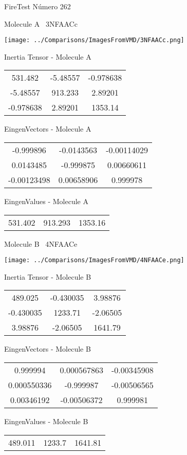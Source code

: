 \vtab[-3cm]
\begin{center}
{\large FireTest \tab Número 262}
\end{center}
\begin{multicols}{2}
\begin{center}

Molecule A \
3NFAACc

\texttt{[image: ../Comparisons/ImagesFromVMD/3NFAACc.png]}

Inertia Tensor - Molecule A \\
\begin{tabular}{|c c c|}
531.482	 & 	-5.48557	 & 	-0.978638	 \\
-5.48557	 & 	913.233	 & 	2.89201	 \\
-0.978638	 & 	2.89201	 & 	1353.14
\end{tabular}

\vtab
 EingenVectors - Molecule A     \\
\begin{tabular}{|c c c|}
-0.999896	 & 	-0.0143563	 & 	-0.00114029	 \\
0.0143485	 & 	-0.999875	 & 	0.00660611	 \\
-0.00123498	 & 	0.00658906	 & 	0.999978
\end{tabular}

\vtab
 EingenValues - Molecule A     \\
\begin{tabular}{|c c c|}
531.402	 & 	913.293	 & 	1353.16	 \\
\end{tabular}
\columnbreak

Molecule B \
4NFAACe

\texttt{[image: ../Comparisons/ImagesFromVMD/4NFAACe.png]}

Inertia Tensor - Molecule B \\
\begin{tabular}{|c c c|}
489.025	 & 	-0.430035	 & 	3.98876	 \\
-0.430035	 & 	1233.71	 & 	-2.06505	 \\
3.98876	 & 	-2.06505	 & 	1641.79
\end{tabular}

\vtab
 EingenVectors - Molecule B     \\
\begin{tabular}{|c c c|}
0.999994	 & 	0.000567863	 & 	-0.00345908	 \\
0.000550336	 & 	-0.999987	 & 	-0.00506565	 \\
0.00346192	 & 	-0.00506372	 & 	0.999981
\end{tabular}

\vtab
 EingenValues - Molecule B     \\
\begin{tabular}{|c c c|}
489.011	 & 	1233.7	 & 	1641.81	 \\
\end{tabular}

\end{center}
\end{multicols}

